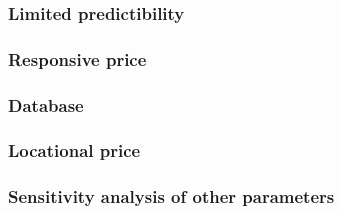 \subsubsection{Limited predictibility}

\subsubsection{Responsive price}

\subsubsection{Database}

\subsubsection{Locational price}

\subsubsection{Sensitivity analysis of other parameters}





